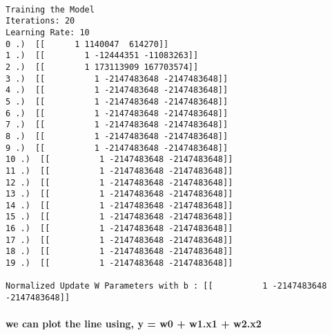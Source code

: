 \documentclass[11pt]{article}
\begin{document}
    \begin{Verbatim}[commandchars=\\\{\}]

Training the Model
Iterations: 20
Learning Rate: 10
0 .)  [[      1 1140047  614270]]
1 .)  [[        1 -12444351 -11083263]]
2 .)  [[        1 173113909 167703574]]
3 .)  [[          1 -2147483648 -2147483648]]
4 .)  [[          1 -2147483648 -2147483648]]
5 .)  [[          1 -2147483648 -2147483648]]
6 .)  [[          1 -2147483648 -2147483648]]
7 .)  [[          1 -2147483648 -2147483648]]
8 .)  [[          1 -2147483648 -2147483648]]
9 .)  [[          1 -2147483648 -2147483648]]
10 .)  [[          1 -2147483648 -2147483648]]
11 .)  [[          1 -2147483648 -2147483648]]
12 .)  [[          1 -2147483648 -2147483648]]
13 .)  [[          1 -2147483648 -2147483648]]
14 .)  [[          1 -2147483648 -2147483648]]
15 .)  [[          1 -2147483648 -2147483648]]
16 .)  [[          1 -2147483648 -2147483648]]
17 .)  [[          1 -2147483648 -2147483648]]
18 .)  [[          1 -2147483648 -2147483648]]
19 .)  [[          1 -2147483648 -2147483648]]

Normalized Update W Parameters with b : [[          1 -2147483648 -2147483648]]

    \end{Verbatim}

    \paragraph{we can plot the line using, y = w0 + w1.x1 +
w2.x2}\label{we-can-plot-the-line-using-y-w0-w1.x1-w2.x2}

\paragraph{}\label{section}


    
    
    
    
\end{document}
